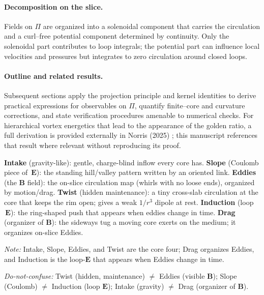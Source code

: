 \paragraph{Decomposition on the slice.}
Fields on $\Pi$ are organized into a solenoidal component that carries the circulation and a curl–free potential component determined by continuity. Only the solenoidal part contributes to loop integrals; the potential part can influence local velocities and pressures but integrates to zero circulation around closed loops.

\paragraph{Outline and related results.}
Subsequent sections apply the projection principle and kernel identities to derive practical expressions for observables on $\Pi$, quantify finite–core and curvature corrections, and state verification procedures amenable to numerical checks. For hierarchical vortex energetics that lead to the appearance of the golden ratio, a full derivation is provided externally in Norris (2025) \cite{Norris2025GoldenRatio}; this manuscript references that result where relevant without reproducing its proof.

\begin{tcolorbox}[title=Terminology spine (plain language)]
\textbf{Intake} (gravity-like): gentle, charge-blind inflow every core has.
\textbf{Slope} (Coulomb piece of $\,\mathbf E$): the standing hill/valley pattern written by an oriented link.
\textbf{Eddies} (the $\mathbf B$ field): the on-slice circulation map (whirls with no loose ends), organized by motion/drag.
\textbf{Twist} (hidden maintenance): a tiny cross-slab circulation at the core that keeps the rim open; gives a weak $1/r^3$ dipole at rest.
\textbf{Induction} (loop $\,\mathbf E$): the ring-shaped push that appears when eddies change in time.
\textbf{Drag} (organizer of $\mathbf B$): the sideways tug a moving core exerts on the medium; it organizes on-slice Eddies.
\end{tcolorbox}

\emph{Note:} Intake, Slope, Eddies, and Twist are the core four; Drag organizes Eddies, and Induction is the loop-$\mathbf E$ that appears when Eddies change in time.

\textit{Do-not-confuse:} Twist (hidden, maintenance) $\neq$ Eddies (visible $\mathbf B$); Slope (Coulomb) $\neq$ Induction (loop $\mathbf E$); Intake (gravity) $\neq$ Drag (organizer of $\mathbf B$).

